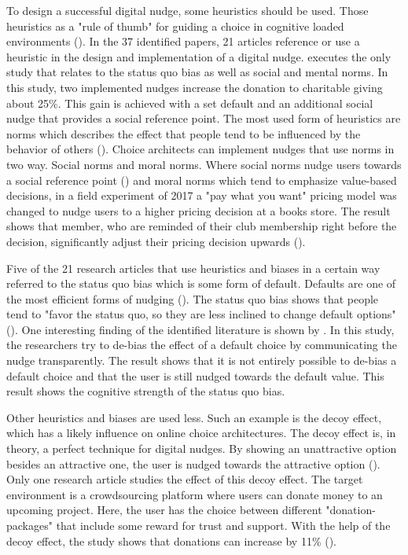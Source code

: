 To design a successful digital nudge, some heuristics should be used. Those heuristics as a "rule of thumb" for guiding a choice in cognitive loaded environments (\cite{thaler_nudge:_2009}). In the 37 identified papers, 21 articles reference or use a heuristic in the design and implementation of a digital nudge. \cite{zarghamee_nudging_2017} executes the only study that relates to the status quo bias as well as social and mental norms. In this study, two implemented nudges increase the donation to charitable giving about 25\%. This gain is achieved with a set default and an additional social nudge that provides a social reference point.
The most used form of heuristics are norms which describes the effect that people tend to be influenced by the behavior of others (\cite{schneider_digital_2018}). Choice architects can implement nudges that use norms in two way. Social norms and moral norms. Where social norms nudge users towards a social reference point (\cite{wang_socially_2018}) and moral norms which tend to emphasize value-based decisions, in a field experiment of 2017 a "pay what you want" pricing model was changed to nudge users to a higher pricing decision at a books store. The result shows that member, who are reminded of their club membership right before the decision, significantly adjust their pricing decision upwards (\cite{gravert_pride_2017}).

Five of the 21 research articles that use heuristics and biases in a certain way referred to the status quo bias which is some form of default. Defaults are one of the most efficient forms of nudging (\cite{johnson_defaults_2003}). The status quo bias shows that people tend to "favor the status quo, so they are less inclined to change default options" (\cite{schneider_digital_2018}). One interesting finding of the identified literature is shown by \cite{steffel_ethically_2016}. In this study, the researchers try to de-bias the effect of a default choice by communicating the nudge transparently. The result shows that it is not entirely possible to de-bias a default choice and that the user is still nudged towards the default value. This result shows the cognitive strength of the status quo bias.

Other heuristics and biases are used less. Such an example is the decoy effect, which has a likely influence on online choice architectures. The decoy effect is, in theory, a perfect technique for digital nudges. By showing an unattractive option besides an attractive one, the user is nudged towards the attractive option (\cite{schneider_digital_2018}). Only one research article studies the effect of this decoy effect. The target environment is a crowdsourcing platform where users can donate money to an upcoming project. Here, the user has the choice between different "donation-packages" that include some reward for trust and support. With the help of the decoy effect, the study shows that donations can increase by 11\% (\cite{tietz_decoy_2016}).

